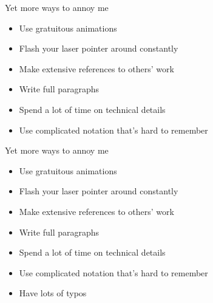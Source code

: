 \documentclass[12pt]{article}
\newcommand{\headsize}{\fontsize{35}{35} \selectfont}
\newcommand{\smallsize}{\fontsize{25}{30} \selectfont}
\begin{document}
\newpage

\headsize \color{myyellow}
\hfill \begin{minipage}{6.25in}
\centering
Yet more ways to annoy me
\end{minipage}

\vspace{30mm} \color{mywhite} \smallsize

\hfill \begin{minipage}{9.5in}

\begin{itemize}
\itemsep18pt

\item Use gratuitous animations

\item Flash your laser pointer around constantly 

\item Make extensive references to others' work

\item Write full paragraphs
\item Spend a lot of time on technical details

\item Use complicated notation that's hard to remember

\end{itemize}

\end{minipage}


\newpage

\headsize \color{myyellow}
\hfill \begin{minipage}{6.25in}
\centering
Yet more ways to annoy me
\end{minipage}

\vspace{30mm} \color{mywhite} \smallsize

\hfill \begin{minipage}{9.5in}

\begin{itemize}
\itemsep18pt

\item Use gratuitous animations

\item Flash your laser pointer around constantly 

\item Make extensive references to others' work

\item Write full paragraphs
\item Spend a lot of time on technical details

\item Use complicated notation that's hard to remember

\item Have lots of typos

\end{itemize}

\end{minipage}
\end{document}
